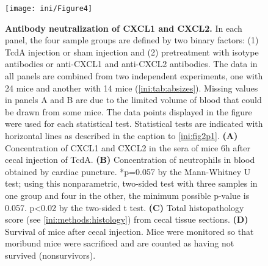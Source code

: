             
\begin{figure}[b!]
  \centering
  \texttt{[image: ini/Figure4]}
  \caption[Antibody neutralization of CXCL1 and CXCL2]{
       \textbf{Antibody neutralization of CXCL1 and CXCL2.}
        In each panel, the four sample groups are defined by two binary 
        factors: (1) TcdA injection or sham injection and (2) pretreatment 
        with isotype antibodies or anti-CXCL1 and anti-CXCL2 antibodies. 
        The data in all panels are combined from two independent 
        experiments, one with 24 mice and another with 14 mice 
        (\autoref{ini:tab:absizes}). Missing values in panels A and 
        B are due to the limited volume of blood that could be 
        drawn from some mice. The data points displayed in the figure 
        were used for each statistical test. Statistical tests are 
        indicated with horizontal lines as described in the caption 
        to \autoref{ini:fig2p1}. \textbf{(A)} Concentration of CXCL1 
        and CXCL2 in the sera of mice 6h after cecal injection of 
        TcdA. \textbf{(B)} Concentration of neutrophils in blood 
        obtained by cardiac puncture. *p=0.057 by the Mann-Whitney 
        U test; using this nonparametric, two-sided test with three 
        samples in one group and four in the other, the minimum 
        possible p-value is 0.057. p<0.02 by the two-sided t test. 
        \textbf{(C)} Total histopathology score 
        (see \ref{ini:methods:histology}) from cecal tissue 
        sections. \textbf{(D)} Survival of mice after cecal 
        injection. Mice were monitored so that moribund mice 
        were sacrificed and are counted as having not survived (nonsurvivors). 
  }
  \label{ini:fig4}
\end{figure}

